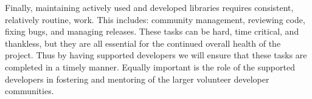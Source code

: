 \documentclass[12pt]{article}
\numberwithin{page}{section}
\begin{document}
Finally, maintaining actively used and developed libraries requires consistent,
relatively routine, work.  This includes: community management, reviewing code,
fixing bugs, and managing releases.  These tasks can be hard, time critical,
and thankless, but they are all essential for the continued overall health of the
project.  Thus by having supported developers we will ensure that these tasks
are completed in a timely manner.  Equally important is the role of the
supported developers in fostering and mentoring
of the larger volunteer developer communities.




\end{document}
